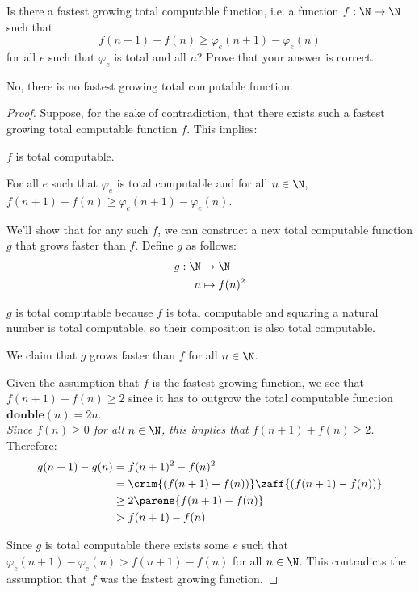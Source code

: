 \begin{problem}
  Is there a fastest growing total computable function,
  i.e. a function $f : \N \to \N$ such that
  \[ f(n + 1) - f(n) \geq \varphi_e(n + 1) - \varphi_e(n) \]
  for all $e$ such that $\varphi_e$ is total and all $n$?
  Prove that your answer is correct.

  \begin{answer}
    No, there is no fastest growing total computable function.
    
    \begin{proof}
      Suppose, for the sake of contradiction, that there exists such a fastest growing total computable function $f$.
      This implies:
      \begin{enumarabic}
        \item $f$ is total computable.\label{1:computable}
        \item For all $e$ such that $\varphi_e$ is total computable and for all $n \in \N$,
          $f(n + 1) - f(n) \geq \varphi_e(n + 1) - \varphi_e(n)$.~\label{1:fastest}
      \end{enumarabic}

      We'll show that for any such $f$, we can construct a new total computable function $g$ that grows faster than $f$.
      Define $g$ as follows:
      \begin{align*}
        g : \N &\to \N \\
        n &\mapsto f(n)^2
      \end{align*}

      \begin{enumarabic}
        \item $g$ is total computable because $f$ is total computable 
          and squaring a natural number is total computable,
          so their composition is also total computable.
        \item We claim that $g$ grows faster than $f$ for all $n \in \N$.

          Given the assumption that $f$ is the fastest growing function,
          we see that $f(n+1) - f(n) \geq 2$ since it has to outgrow the total computable function
          $\mathbf{double}(n) = 2n$. \\
          \emph{Since $f(n) \geq 0$ for all $n \in \N$, this implies that $f(n+1) + f(n) \geq 2$.}
          Therefore:
          \begin{align*}
            g(n + 1) - g(n) &= f(n + 1)^2 - f(n)^2 \\
                            &= \crim{(f(n + 1) + f(n))}\zaff{(f(n + 1) - f(n))} \\
                            &\geq 2 \parens{f(n + 1) - f(n)} \\
                            &> f(n + 1) - f(n)
          \end{align*}
      \end{enumarabic}
      Since $g$ is total computable there exists some $e$ such that
      $\varphi_e(n+1) - \varphi_e(n) > f(n+1) - f(n)$
      for all $n \in \N$.
      This contradicts the assumption that $f$ was the fastest growing function.
    \end{proof}
  \end{answer}
\end{problem}
